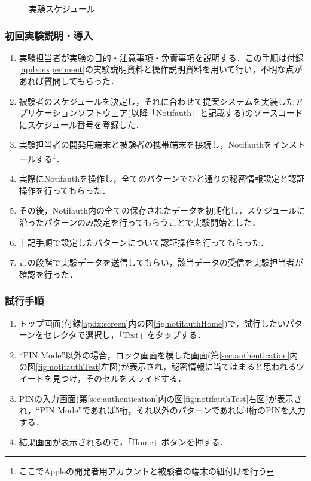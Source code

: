 \begin{figure}[ht]
  \begin{center}
  \end{center}
  \caption{実験スケジュール}
  \label{fig:schedule}
\end{figure}

\subsubsection{初回実験説明・導入}
\begin{enumerate}
  \item 実験担当者が実験の目的・注意事項・免責事項を説明する．この手順は付録\ref{apdx:experiment}の実験説明資料と操作説明資料を用いて行い，不明な点があれば質問してもらった．
  \item 被験者のスケジュールを決定し，それに合わせて提案システムを実装したアプリケーションソフトウェア(以降「Notifauth」と記載する)のソースコードにスケジュール番号を登録した．
  \item 実験担当者の開発用端末と被験者の携帯端末を接続し，Notifauthをインストールする\footnote{ここでAppleの開発者用アカウントと被験者の端末の紐付けを行う}．
  \item 実際にNotifauthを操作し，全てのパターンでひと通りの秘密情報設定と認証操作を行ってもらった．
  \item その後，Notifauth内の全ての保存されたデータを初期化し，スケジュールに沿ったパターンのみ設定を行ってもらうことで実験開始とした．
  \item 上記手順で設定したパターンについて認証操作を行ってもらった．
  \item この段階で実験データを送信してもらい，該当データの受信を実験担当者が確認を行った．
\end{enumerate}

\subsubsection{試行手順}
\begin{enumerate}
  \item トップ画面(付録\ref{apdx:screen}内の図\ref{fig:notifauthHome})で，試行したいパターンをセレクタで選択し，「Test」をタップする．
  \item ``PIN Mode''以外の場合，ロック画面を模した画面(第\ref{sec:authentication}内の図\ref{fig:notifauthTest}左図)が表示され，秘密情報に当てはまると思われるツイートを見つけ，そのセルをスライドする．
  \item PINの入力画面(第\ref{sec:authentication}内の図\ref{fig:notifauthTest}右図)が表示され，``PIN Mode''であれば5桁，それ以外のパターンであれば4桁のPINを入力する．
  \item 結果画面が表示されるので，「Home」ボタンを押する．
\end{enumerate}

